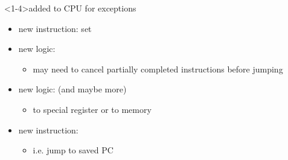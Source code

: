 \begin{frame}<1-4>{added to CPU for exceptions}
\begin{itemize}
\item new instruction: set 
\item new logic: 
    \begin{itemize}
    \item may need to cancel partially completed instructions before jumping
    \end{itemize}
\item new logic:  (and maybe more)
    \begin{itemize}
    \item to special register or to memory
    \end{itemize}
\item new instruction: 
    \begin{itemize}
    \item i.e. jump to saved PC
    \end{itemize}
\end{itemize}
\end{frame}

